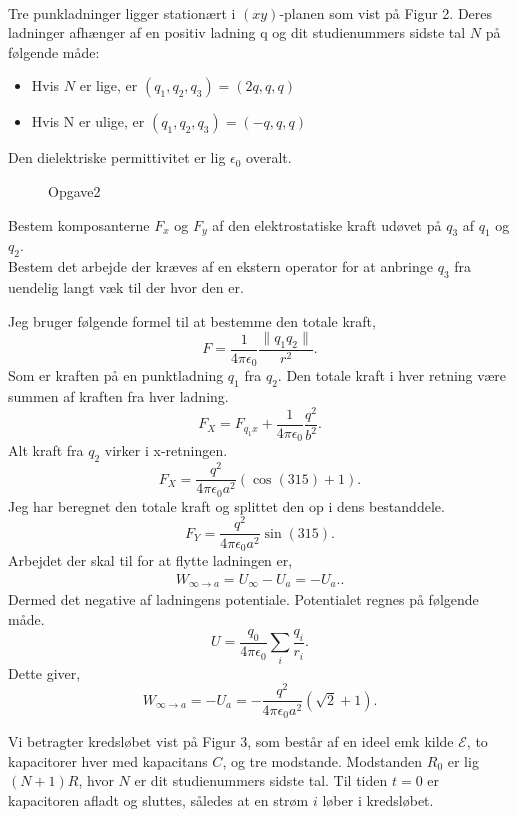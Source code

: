 \\
\begin{exercise}[Opgave 2]
	Tre punkladninger ligger stationært i $(xy)$-planen som vist på Figur 2. Deres
ladninger afhænger af en positiv ladning q og dit studienummers sidste
tal $N$ på følgende måde:
\begin{itemize}
	\item  Hvis $N$ er lige, er $(q_1 , q_2 , q_3 ) = (2q, q, q)$
	\item  Hvis N er ulige, er $(q_1 , q_2 , q_3 ) = (−q, q, q)$
\end{itemize}
Den dielektriske permittivitet er lig $\epsilon_0$ overalt.
\end{exercise}
\begin{figure}[ht]
    \centering
    \caption{Opgave2}
    \label{fig:opgave2}
\end{figure}
\begin{subexercise}[a]
Bestem komposanterne $F_x$ og $F_y$ af den elektrostatiske kraft udøvet på $q_3$ af $q_1$ og $q_2$. \\
Bestem det arbejde der kræves af en ekstern operator for at anbringe $q_3$ fra uendelig langt væk til der hvor den er.
\end{subexercise}
\begin{solution}
Jeg bruger følgende formel til at bestemme den totale kraft,
\[
F = \frac{1}{4\pi\epsilon_0} \frac{\|q_1q_2\|}{r^2}
.\] 
Som er kraften på en punktladning $q_1$ fra $q_2$. Den totale kraft i hver retning være summen af kraften fra hver ladning.
\[
F_X = F_{q_1x} + \frac{1}{4\pi\epsilon_0}\frac{q^2}{b^2}
.\]
Alt kraft fra $q_2$ virker i x-retningen.
\[
F_X = \frac{q^2}{4\pi\epsilon_0a^2} \left( \cos\left( 315 \right) + 1 \right) 
.\]
Jeg har beregnet den totale kraft og splittet den op i dens bestanddele.
\[
	F_Y = \frac{q^2}{4\pi\epsilon_0a^2} \sin\left( 315 \right) 
.\]
Arbejdet der skal til for at flytte ladningen er,
 \begin{align*}
	W_{\infty \to a} = U_{\infty} - U_a = -U_a.
.\end{align*}
Dermed det negative af ladningens potentiale. Potentialet regnes på følgende måde.
\[
U = \frac{q_0}{4\pi\epsilon_0}\sum_i \frac{q_i}{r_i}
.\]
Dette giver, 
\[
W_{\infty\to a} = -U_a = -\frac{q^2}{4\pi\epsilon_0a^2}\left( \sqrt{2} +1 \right) 
.\] 
\end{solution}
\newpage
\begin{exercise}[Opgave 3]
	Vi betragter kredsløbet vist på Figur 3, som består af en ideel emk kilde $\mathcal{E} $, to kapacitorer hver med kapacitans $C$, og tre modstande. Modstanden $R_0$ er lig $\left( N+1 \right) R$, hvor $N$ er dit studienummers sidste tal. Til tiden $t=0$ er kapacitoren afladt og sluttes, således at en strøm $i$ løber i kredsløbet.
\end{exercise}
